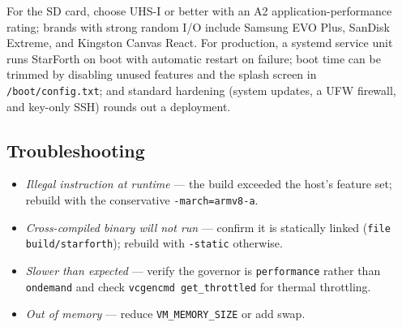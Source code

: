 For the SD card, choose UHS-I or better with an A2 application-performance
rating; brands with strong random I/O include Samsung EVO Plus, SanDisk
Extreme, and Kingston Canvas React. For production, a systemd service unit runs
StarForth on boot with automatic restart on failure; boot time can be trimmed
by disabling unused features and the splash screen in \texttt{/boot/config.txt};
and standard hardening (system updates, a UFW firewall, and key-only SSH)
rounds out a deployment.

\subsection{Troubleshooting}

\begin{itemize}
  \item \emph{Illegal instruction at runtime} --- the build exceeded the host's
    feature set; rebuild with the conservative \texttt{-march=armv8-a}.
  \item \emph{Cross-compiled binary will not run} --- confirm it is statically
    linked (\texttt{file build/starforth}); rebuild with \texttt{-static}
    otherwise.
  \item \emph{Slower than expected} --- verify the governor is
    \texttt{performance} rather than \texttt{ondemand} and check
    \texttt{vcgencmd get\_throttled} for thermal throttling.
  \item \emph{Out of memory} --- reduce \texttt{VM\_MEMORY\_SIZE} or add swap.
\end{itemize}

